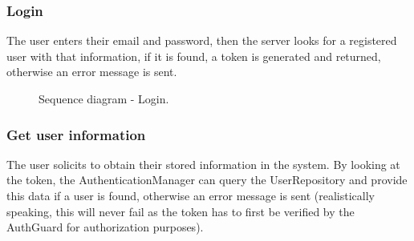 \subsubsection{Login}
The user enters their email and password, then the server looks for a registered user with that information, if it is found, a token is generated and returned, otherwise an error message is sent.

\begin{figure}[H]
    \centering
    \caption{\label{fig:sequence-registration}Sequence diagram - Login.}
\end{figure}

\subsubsection{Get user information}
The user solicits to obtain their stored information in the system. By looking at the token, the AuthenticationManager can query the UserRepository and provide this data if a user is found, otherwise an error message is sent (realistically speaking, this will never fail as the token has to first be verified by the AuthGuard for authorization purposes).

